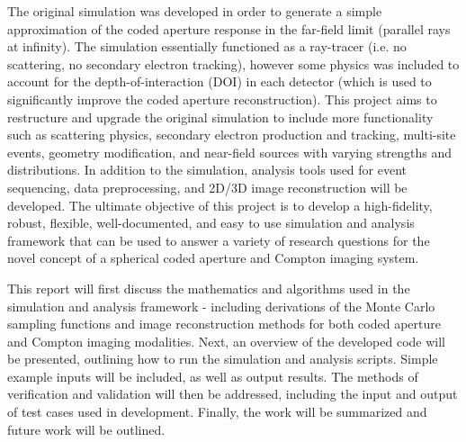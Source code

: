 \documentclass[10pt]{article}
\begin{document}
The original simulation was developed in order to generate a simple approximation of the coded aperture response in the far-field limit (parallel rays at infinity). The simulation essentially functioned as a ray-tracer (i.e. no scattering, no secondary electron tracking), however some physics was included to account for the depth-of-interaction (DOI) in each detector (which is used to significantly improve the coded aperture reconstruction). This project aims to restructure and upgrade the original simulation to include more functionality such as scattering physics, secondary electron production and tracking, multi-site events, geometry modification, and near-field sources with varying strengths and distributions. In addition to the simulation, analysis tools used for event sequencing, data preprocessing, and 2D/3D image reconstruction will be developed. The ultimate objective of this project is to develop a high-fidelity, robust, flexible, well-documented, and easy to use simulation and analysis framework that can be used to answer a variety of research questions for the novel concept of a spherical coded aperture and Compton imaging system. 

This report will first discuss the mathematics and algorithms used in the simulation and analysis framework - including derivations of the Monte Carlo sampling functions and image reconstruction methods for both coded aperture and Compton imaging modalities. Next, an overview of the developed code will be presented, outlining how to run the simulation and analysis scripts. Simple example inputs will be included, as well as output results. The methods of verification and validation will then be addressed, including the input and output of test cases used in development. Finally, the work will be summarized and future work will be outlined. 
\end{document}
